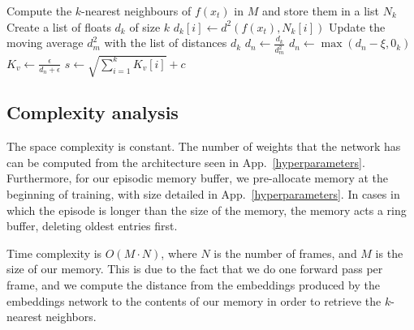 \documentclass{article} %
\begin{document}
\begin{algorithm}[!h]
\label{reward_algorithm}
\DontPrintSemicolon
\SetAlgoLined
{}
\BlankLine
Compute the $k$-nearest neighbours of $f(x_t)$ in $M$ and store them in a list $N_k$\;
Create a list of floats $d_{k}$ of size $k$\;
    {    
    \BlankLine
    $d_k[i] \leftarrow d^2(f(x_t), N_k[i])$
    }
Update the moving average $d^2_m$ with the list of distances $d_k$\;
$d_n \leftarrow \frac{d_k}{d^2_m}$\;
$d_n \leftarrow \max(d_n-\xi, 0_k)$\;
$K_v \leftarrow \frac{\epsilon}{d_n + \epsilon}$\;
$s \leftarrow \sqrt{\sum_{i=1}^k K_v[i]} + c$\;
\caption{Computation of the episodic intrinsic reward at time $t$: $r_t^{\text{episodic}}$.}
\end{algorithm}

\subsection{Complexity analysis}

The space complexity is constant. The number of weights that the network has can be computed from the architecture seen in App.~\ref{hyperparameters}. Furthermore, for our episodic memory buffer, we pre-allocate memory at the beginning of training, with size detailed in App.~\ref{hyperparameters}. In cases in which the episode is longer than the size of the memory, the memory acts a ring buffer, deleting oldest entries first.

Time complexity is $O(M\cdot N)$, where $N$ is the number of frames, and $M$ is the size of our memory. This is due to the fact that we do one forward pass per frame, and we compute the distance from the embeddings produced by the embeddings network to the contents of our memory in order to retrieve the $k$-nearest neighbors.
\end{document}
